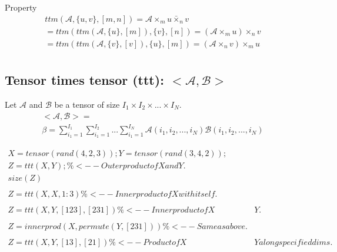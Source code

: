 \documentclass{Note}
\begin{document}
Property
\begin{equation}
\begin{aligned}
ttm(\mathcal{A},\{u,v\},[m,n])=\mathcal{A}{\times}_m u \bar{\times}_n v\\
=ttm(ttm(\mathcal{A},\{u\},[m]),\{v\},[n])=(\mathcal{A}{\times}_m u ){\times}_{n} v\\
=ttm(ttm(\mathcal{A},\{v\},[v]),\{u\},[m])=(\mathcal{A}{\times}_n v ) {\times}_{m} u\\
\end{aligned}
\end{equation}


\subsection{Tensor times tensor (ttt): $<\mathcal{A},\mathcal{B}>$}
Let $\mathcal{A}$ and $\mathcal{B}$ be a tensor of size $I_1\times I_2\times ...\times I_N$.
\begin{equation}
\begin{aligned}
<\mathcal{A},\mathcal{B}>=\\
\beta=\sum_{i_1=1}^{I_1}\sum_{i_1=1}^{I_2}...\sum_{i_1=1}^{I_N}\mathcal{A}(i_1,i_2,...,i_N)\mathcal{B}(i_1,i_2,...,i_N)
\end{aligned}
\end{equation}

\begin{equation}
\begin{aligned}
X = tensor(rand(4,2,3)); Y = tensor(rand(3,4,2));\\
Z = ttt(X,Y); \%<-- Outer product of X and Y.\\
size(Z)\\
\\
Z = ttt(X,X,1:3) \%<-- Inner product of X with itself.\\
\\
Z = ttt(X,Y,[1 2 3],[2 3 1]) \%<-- Inner product of X & Y.\\
\\
Z = innerprod(X,permute(Y, [2 3 1])) \%<-- Same as above.\\
\\
Z = ttt(X,Y,[1 3],[2 1]) \%<-- Product of X & Y along specified dims.\\
\end{aligned}
\end{equation}
\end{document}
